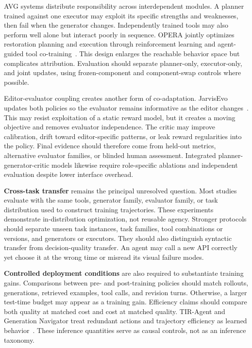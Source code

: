 AVG systems distribute responsibility across interdependent modules. A planner trained against one executor may exploit its specific strengths and weaknesses, then fail when the generator changes. Independently trained tools may also perform well alone but interact poorly in sequence. OPERA jointly optimizes restoration planning and execution through reinforcement learning and agent-guided tool co-training~\cite{avg260522104}. This design enlarges the reachable behavior space but complicates attribution. Evaluation should separate planner-only, executor-only, and joint updates, using frozen-component and component-swap controls where possible.

Editor-evaluator coupling creates another form of co-adaptation. JarvisEvo updates both policies so the evaluator remains informative as the editor changes~\cite{avg251123002}. This may resist exploitation of a static reward model, but it creates a moving objective and removes evaluator independence. The critic may improve calibration, drift toward editor-specific patterns, or leak reward regularities into the policy. Final evidence should therefore come from held-out metrics, alternative evaluator families, or blinded human assessment. Integrated planner-generator-critic models likewise require role-specific ablations and independent evaluation despite lower interface overhead.

\textbf{Cross-task transfer} remains the principal unresolved question. Most studies evaluate with the same tools, generator family, evaluator family, or task distribution used to construct training trajectories. These experiments demonstrate in-distribution optimization, not reusable agency. Stronger protocols should separate unseen task instances, task families, tool combinations or versions, and generators or executors. They should also distinguish syntactic transfer from decision-quality transfer. An agent may call a new API correctly yet choose it at the wrong time or misread its visual failure modes.

\textbf{Controlled deployment conditions} are also required to substantiate training gains. Comparisons between pre- and post-training policies should match rollouts, generations, retrieved examples, tool calls, and revision turns. Otherwise, a larger test-time budget may appear as a training gain. Efficiency claims should compare both quality at matched cost and cost at matched quality. TIR-Agent and Generation Navigator treat redundant actions and trajectory efficiency as learned behavior~\cite{avg260327742,avg260517969}. These inference quantities serve as causal controls, not as an inference taxonomy.

